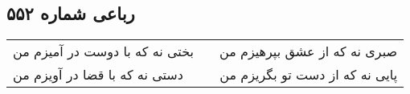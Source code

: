 \begin{center}
\section*{رباعی شماره ۵۵۲}
\label{sec:sh552}
\begin{longtable}{l p{0.5cm} r}
بختی نه که با دوست در آمیزم من
&&
صبری نه که از عشق بپرهیزم من
\\
دستی نه که با قضا در آویزم من
&&
پایی نه که از دست تو بگریزم من
\\
\end{longtable}
\end{center}
